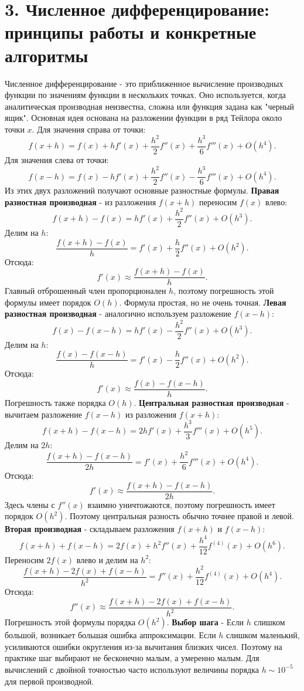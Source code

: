 \documentclass[12pt,a4paper]{article}
\begin{document}
\section{3. Численное дифференцирование: принципы работы и конкретные алгоритмы}
Численное дифференцирование - это приближенное вычисление производных функции по значениям функции в нескольких точках.
Оно используется, когда аналитическая производная неизвестна, сложна или функция задана как "черный ящик".
Основная идея основана на разложении функции в ряд Тейлора около точки $x$. Для значения справа от точки:
\[
f(x+h)=f(x)+h f'(x)+\frac{h^2}{2}f''(x)+\frac{h^3}{6}f'''(x)+O(h^4).
\]
Для значения слева от точки:
\[
f(x-h)=f(x)-h f'(x)+\frac{h^2}{2}f''(x)-\frac{h^3}{6}f'''(x)+O(h^4).
\]
Из этих двух разложений получают основные разностные формулы.
\textbf{Правая разностная производная} - из разложения $f(x+h)$ переносим $f(x)$ влево:
\[
f(x+h)-f(x)=h f'(x)+\frac{h^2}{2}f''(x)+O(h^3).
\]
Делим на $h$:
\[
\frac{f(x+h)-f(x)}{h}=f'(x)+\frac{h}{2}f''(x)+O(h^2).
\]
Отсюда:
\[
f'(x) \approx \frac{f(x+h)-f(x)}{h}.
\]
Главный отброшенный член пропорционален $h$, поэтому погрешность этой формулы имеет порядок $O(h)$. Формула простая, но не очень точная.
\textbf{Левая разностная производная} - аналогично используем разложение $f(x-h)$:
\[
f(x)-f(x-h)=h f'(x)-\frac{h^2}{2}f''(x)+O(h^3).
\]
Делим на $h$:
\[
\frac{f(x)-f(x-h)}{h}=f'(x)-\frac{h}{2}f''(x)+O(h^2).
\]
Отсюда:
\[
f'(x) \approx \frac{f(x)-f(x-h)}{h}.
\]
Погрешность также порядка $O(h)$.
\textbf{Центральная разностная производная} - вычитаем разложение $f(x-h)$ из разложения $f(x+h)$:
\[
f(x+h)-f(x-h)=2h f'(x)+\frac{h^3}{3}f'''(x)+O(h^5).
\]
Делим на $2h$:
\[
\frac{f(x+h)-f(x-h)}{2h}=f'(x)+\frac{h^2}{6}f'''(x)+O(h^4).
\]
Отсюда:
\[
f'(x) \approx \frac{f(x+h)-f(x-h)}{2h}.
\]
Здесь члены с $f''(x)$ взаимно уничтожаются, поэтому погрешность имеет порядок $O(h^2)$. Поэтому центральная разность обычно точнее правой и левой.
\textbf{Вторая производная} - складываем разложения $f(x+h)$ и $f(x-h)$:
\[
f(x+h)+f(x-h)=2f(x)+h^2 f''(x)+\frac{h^4}{12}f^{(4)}(x)+O(h^6).
\]
Переносим $2f(x)$ влево и делим на $h^2$:
\[
\frac{f(x+h)-2f(x)+f(x-h)}{h^2}=f''(x)+\frac{h^2}{12}f^{(4)}(x)+O(h^4).
\]
Отсюда:
\[
f''(x) \approx \frac{f(x+h)-2f(x)+f(x-h)}{h^2}.
\]
Погрешность этой формулы порядка $O(h^2)$.
\textbf{Выбор шага} - Если $h$ слишком большой, возникает большая ошибка аппроксимации. Если $h$ слишком маленький, усиливаются ошибки округления из-за вычитания близких чисел.
Поэтому на практике шаг выбирают не бесконечно малым, а умеренно малым. Для вычислений с двойной точностью часто используют величины порядка $h \sim 10^{-5}$
для первой производной.
\end{document}
